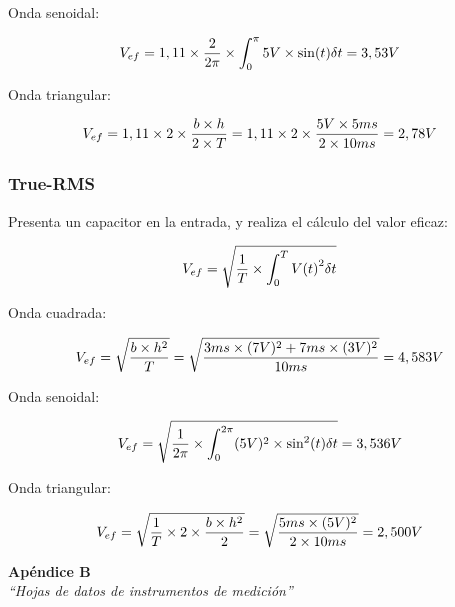 \documentclass{article}
\begin{document}
Onda senoidal:

\begin{center}
\begin{equation}
V_{ef} = 1,11 \times {2 \over 2\pi} \times \int_{0}^{\pi} 5V \times \sin (t)\delta t = 3,53 V
\end{equation}
\end{center}
\medskip

Onda triangular:

\begin{center}
\begin{equation}
V_{ef} = 1,11 \times 2 \times {b \times h \over 2 \times T} = 1,11 \times 2 \times {5V \times 
5ms \over 2 \times 10ms} = 2,78V
\end{equation}
\end{center}
\bigskip

\subsubsection{True-RMS}

Presenta un capacitor en la entrada, y realiza el cálculo del valor eficaz:
\begin{center}
\begin{equation}
V_{ef} = \sqrt{ {{1}\over{T}} \times \int_{0}^{T} {V(t)}^2 \delta t}
\end{equation}
\end{center}
\medskip

Onda cuadrada:

\begin{center}
\begin{equation}
V_{ef} = \sqrt{b \times h^2 \over T} = \sqrt{3ms \times (7V)^2 + 7ms \times (3V)^2 \over 10ms} = 4,583V
\end{equation}
\end{center}
\medskip

Onda senoidal:

\begin{center}
\begin{equation}
V_{ef} = \sqrt{{1 \over 2\pi} \times \int_{0}^{2\pi} (5V)^2 \times \sin ^2 (t)\delta t} = 3,536 V
\end{equation}
\end{center}
\medskip

Onda triangular:

\begin{center}
\begin{equation}
V_{ef} = \sqrt{{1\over T}\times 2 \times {b\times h^2 \over 2}} = \sqrt{5ms \times (5V)^2 \over 2 \times 10ms} = 2,500V
\end{equation}
\end{center}
\medskip




\newpage
\vspace*{4cm}
\begin{center}
	\textbf{\Huge{Apéndice B}} \\
	\bigskip\bigskip
	\Large{\textit{``Hojas de datos de instrumentos de medición''}}
\end{center}
\end{document}
